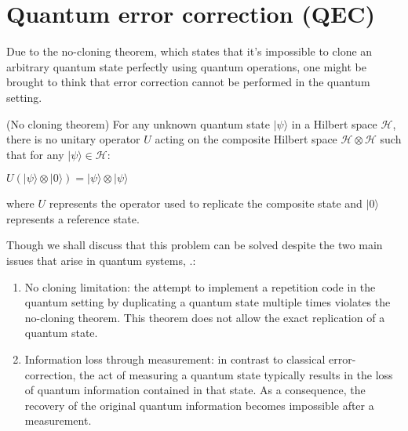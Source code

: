 \documentclass{Configuration_Files/PoliMi3i_thesis}
\begin{document}









\newpage
\section{Quantum error correction (QEC)}
\label{sec:QEC}

Due to the no-cloning theorem, which states that  it's impossible to clone an arbitrary quantum state perfectly using quantum operations, one might be brought to think that error correction cannot be performed in the quantum setting.

\begin{theorem}(No cloning theorem)
	For any unknown quantum state $|\psi\rangle$ in a Hilbert space $\mathscr{H}$, there is no unitary operator $U$ acting on the composite Hilbert space $\mathscr{H} \otimes \mathscr{H}$ such that for any $|\psi\rangle \in \mathscr{H}$:
	
	\begin{center}
		$U(|\psi\rangle\otimes|0\rangle) = |\psi\rangle \otimes |\psi\rangle$
	\end{center}
	
	where $U$ represents the operator used to replicate the composite state and $|0\rangle$ represents a reference state.
\end{theorem}

Though we shall discuss that this problem can be solved despite the two main issues that arise in quantum systems,  \cite{Cha06}.: 

\begin{enumerate}
	\item No cloning limitation: the attempt to implement a repetition code in the quantum setting by duplicating a quantum state multiple times violates the no-cloning theorem. This theorem does not allow the exact replication of a quantum state.
	
	\item Information loss through measurement: in contrast to classical error-correction, the act of measuring a quantum state typically results in the loss of quantum information contained in that state. As a consequence, the recovery of the original quantum information becomes impossible after a measurement.
\end{enumerate}
\end{document}
